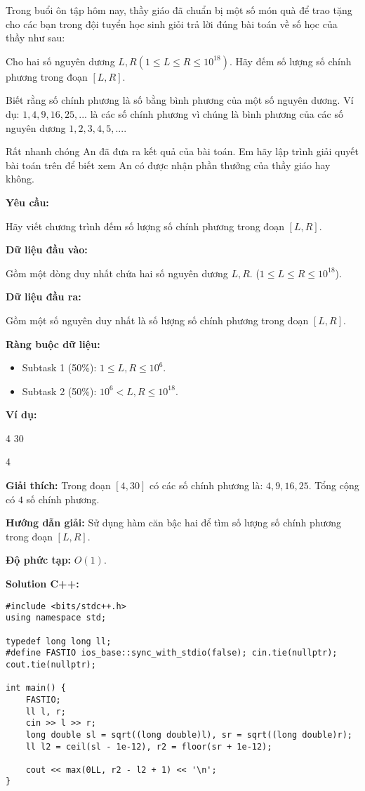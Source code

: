 \documentclass[12pt]{scrartcl}  %
\begin{document}
Trong buổi ôn tập hôm nay, thầy giáo đã chuẩn bị một số món quà để trao tặng cho các bạn trong đội tuyển học sinh giỏi trả lời đúng bài toán về số học của thầy như sau: 

Cho hai số nguyên dương $L, R (1 \leq L \leq R \leq 10^{18})$. Hãy đếm số lượng số chính phương trong đoạn $[L, R]$.

Biết rằng số chính phương là số bằng bình phương của một số nguyên dương. Ví dụ: $1, 4, 9, 16, 25, ...$ là các số chính phương vì chúng là bình phương của các số nguyên dương $1, 2, 3, 4, 5, ...$.

Rất nhanh chóng An đã đưa ra kết quả của bài toán. Em hãy lập trình giải quyết bài toán trên để biết xem An có được nhận phần thưởng của thầy giáo hay không.

\textbf{Yêu cầu:}

Hãy viết chương trình đếm số lượng số chính phương trong đoạn $[L, R]$.

\textbf{Dữ liệu đầu vào:}

Gồm một dòng duy nhất chứa hai số nguyên dương $L, R$. ($1 \leq L \leq R \leq 10^{18}$).

\textbf{Dữ liệu đầu ra:}

Gồm một số nguyên duy nhất là số lượng số chính phương trong đoạn $[L, R]$.

\textbf{Ràng buộc dữ liệu:}

\begin{itemize}
    \item Subtask 1 (50\%): $1 \leq L, R \leq 10^6$.
    \item Subtask 2 (50\%): $10^6 < L, R \leq 10^{18}$.
\end{itemize}

\textbf{Ví dụ:}
\begin{tcolorbox}[colback=gray!5!white, colframe=blue!50!black, title=Input]
4 30
\end{tcolorbox}
\begin{tcolorbox}[colback=gray!5!white, colframe=green!50!black, title=Output]
4
\end{tcolorbox}

\textbf{Giải thích:}
Trong đoạn $[4, 30]$ có các số chính phương là: $4, 9, 16, 25$. Tổng cộng có $4$ số chính phương.

\textbf{Hướng dẫn giải:}
Sử dụng hàm căn bậc hai để tìm số lượng số chính phương trong đoạn $[L, R]$.

\textbf{Độ phức tạp:} $O(1)$.

\textbf{Solution C++:}
\begin{lstlisting}
#include <bits/stdc++.h>
using namespace std;

typedef long long ll;
#define FASTIO ios_base::sync_with_stdio(false); cin.tie(nullptr); cout.tie(nullptr);

int main() {
    FASTIO;
    ll l, r;
    cin >> l >> r;
    long double sl = sqrt((long double)l), sr = sqrt((long double)r);
    ll l2 = ceil(sl - 1e-12), r2 = floor(sr + 1e-12);

    cout << max(0LL, r2 - l2 + 1) << '\n';
}


\end{lstlisting}
\end{document}
